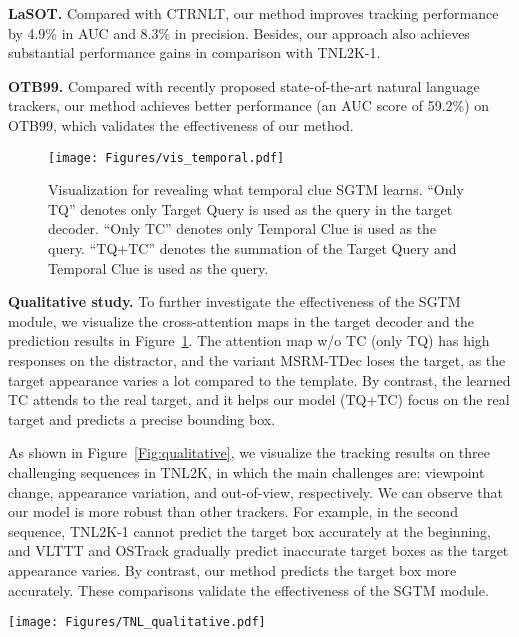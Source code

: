 \noindent\textbf{LaSOT.}
Compared with CTRNLT, our method improves tracking performance by 4.9\% in AUC and 8.3\% in precision. Besides, our approach also achieves substantial performance gains in comparison with TNL2K-1. 

\noindent\textbf{OTB99.} 
Compared with recently proposed state-of-the-art natural language trackers, our method achieves better performance (an AUC score of 59.2\%) on OTB99, which validates the effectiveness of our method.

\begin{figure}[t]
\centering
\texttt{[image: Figures/vis\_temporal.pdf]}
\caption{Visualization for revealing what temporal clue SGTM learns. 
``Only TQ'' denotes only Target Query is used as the query in the target decoder. 
``Only TC'' denotes only Temporal Clue is used as the query. 
``TQ+TC'' denotes the summation of the Target Query and Temporal Clue is used as the query.
}
\label{Fig:vis_temporal}
\end{figure}
\noindent\textbf{Qualitative study.} 
To further investigate the effectiveness of the SGTM module, we visualize the cross-attention maps in the target decoder and the prediction results in Figure~\ref{Fig:vis_temporal}.
The attention map w/o TC (only TQ) has high responses on the distractor, and the variant MSRM-TDec loses the target, as the target appearance varies a lot compared to the template. 
By contrast, the learned TC attends to the real target, and it helps our model (TQ+TC) focus on the real target and predicts a precise bounding box.

As shown in Figure~\ref{Fig:qualitative}, we visualize the tracking results on three challenging sequences in TNL2K, in which the main challenges are: viewpoint change, appearance variation, and out-of-view, respectively. 
We can observe that our model is more robust than other trackers. 
For example, in the second sequence, TNL2K-1 cannot predict the target box accurately at the beginning, and VLTTT and OSTrack gradually predict inaccurate target boxes as the target appearance varies. 
By contrast, our method predicts the target box more accurately.
These comparisons validate the effectiveness of the SGTM module.



\begin{figure*}[t]
\centering
\texttt{[image: Figures/TNL\_qualitative.pdf]}
\vspace{-1mm}
\caption{Qualitative comparison on three challenging sequences. From top to bottom, the main challenge factors are viewpoint change, appearance variation, and out-of-view, respectively. Our model is more robust than other trackers.}
\label{Fig:qualitative}
\end{figure*}


